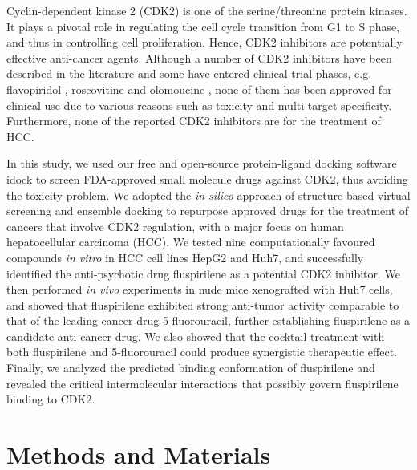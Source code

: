 \documentclass[10pt,letterpaper]{article}
\begin{document}
Cyclin-dependent kinase 2 (CDK2) is one of the serine/threonine protein kinases. It plays a pivotal role in regulating the cell cycle transition from G1 to S phase, and thus in controlling cell proliferation. Hence, CDK2 inhibitors are potentially effective anti-cancer agents. Although a number of CDK2 inhibitors have been described in the literature \cite{1603} and some have entered clinical trial phases, e.g. flavopiridol \cite{1596}, roscovitine \cite{1597} and olomoucine \cite{1598}, none of them has been approved for clinical use due to various reasons such as toxicity and multi-target specificity. Furthermore, none of the reported CDK2 inhibitors are for the treatment of HCC.

In this study, we used our free and open-source protein-ligand docking software idock \cite{1153,1362} to screen FDA-approved small molecule drugs against CDK2, thus avoiding the toxicity problem. We adopted the \textit{in silico} approach of structure-based virtual screening and ensemble docking to repurpose approved drugs for the treatment of cancers that involve CDK2 regulation, with a major focus on human hepatocellular carcinoma (HCC). We tested nine computationally favoured compounds \textit{in vitro} in HCC cell lines HepG2 and Huh7, and successfully identified the anti-psychotic drug fluspirilene as a potential CDK2 inhibitor. We then performed \textit{in vivo} experiments in nude mice xenografted with Huh7 cells, and showed that fluspirilene exhibited strong anti-tumor activity comparable to that of the leading cancer drug 5-fluorouracil, further establishing fluspirilene as a candidate anti-cancer drug. We also showed that the cocktail treatment with both fluspirilene and 5-fluorouracil could produce synergistic therapeutic effect. Finally, we analyzed the predicted binding conformation of fluspirilene and revealed the critical intermolecular interactions that possibly govern fluspirilene binding to CDK2.

\section*{Methods and Materials}
\end{document}
